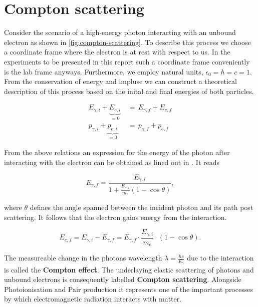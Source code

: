 
\section{Compton scattering}
\label{sec:compton-scattering}

Consider the scenario of a high-energy photon interacting with an unbound electron as
shown in \autoref{fig:compton-scattering}. To describe this process we choose a
coordinate frame where the electron is at rest with respect to us. In the experiments
to be presented in this report such a coordinate frame conveniently is the lab frame
anyways. Furthermore, we employ natural units, $\epsilon_0=\hbar=c=1$. \\
From the conservation of energy and impluse we can construct a theoretical
description of this process based on the inital and final energies of both particles.

\begin{align*}
E_{\gamma,i} + \underbrace{E_{e,i}}_{=0}\,&=\,E_{\gamma,f}+E_{e,f} \\
p_{\gamma,i} + \underbrace{p_{e,i}}_{=0}\,&=\,p_{\gamma,f}+p_{e,f}
\end{align*}

From the above relations an expression for the energy of the photon after interacting
with the electron can be obtained as lined out in \cite{Sch17}. It reads

\begin{equation}
\label{eq:photon-energy}
E_{\gamma,f}=\frac{E_{\gamma,i}}{1+\frac{E_{\gamma,i}}{m_e}(1-\cos\theta)},
\end{equation}

where $\theta$ defines the angle spanned between the incident photon and its path
post scattering. It follows that the electron gains energy from the interaction.

\begin{equation}
\label{eq:electron-energy}
E_{e,f}=E_{\gamma,i}-E_{\gamma,f}=E_{\gamma,f}\cdot\frac{E_{\gamma,i}}{m_e}\cdot(1-\cos\theta).
\end{equation}

The measureable change in the photons wavelength $\lambda=\frac{hc}{E_{\gamma}}$
due to the interaction is called the \textbf{Compton effect}. The underlaying elastic
scattering of photons and unbound electrons is consequently labelled \textbf{Compton
scattering}. Alongside Photoionisation and Pair production it represents one of the
important processes by which electromagnetic radiation interacts with matter.

